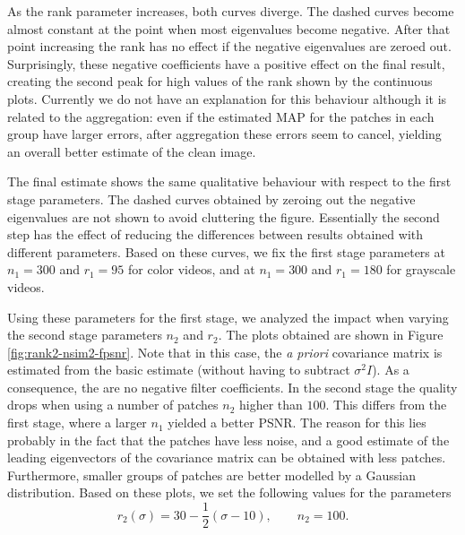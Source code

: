 \documentclass[10pt, a4paper]{article}
\newcommand{\pa}[1]{#1}
\newcommand{\padd}[1]{\pa{#1}}
\newcommand{\pcomment}[1]{}
\begin{document}
\padd{As the rank parameter increases, both curves diverge. 
The dashed curves become almost constant at the point when
most eigenvalues become negative. After that point increasing the
rank has no effect if the negative eigenvalues are zeroed out.
%
Surprisingly, these negative coefficients have a positive effect on the final 
result, creating the second peak for high values of the rank shown by the
continuous plots. Currently we do not have an explanation for this behaviour
although it is related to the aggregation: even if the estimated MAP for the
patches in each group have larger errors, after aggregation these errors seem
to cancel, yielding an overall better estimate of the clean image.}

\padd{The final estimate shows the same qualitative behaviour with respect to the first
stage parameters. The dashed curves obtained by zeroing out the negative
eigenvalues are not shown to avoid cluttering the figure. Essentially the
second step has the effect of reducing the differences between results obtained
with different parameters. Based on these curves, we fix the first stage parameters at
$n_1 = 300$ and $r_1 = 95$ for color videos, and at $n_1 = 300$ and $r_1 = 180$ for grayscale videos.}

Using these parameters for the first stage, we analyzed the impact when varying the second stage
parameters $n_2$ and $r_2$. The plots obtained are shown in Figure
\ref{fig:rank2-nsim2-fpsnr}.
%
Note that in this case, the \emph{a
priori} covariance matrix is estimated from the basic estimate (without having
to subtract $\sigma^2I$). As a consequence, the are no negative filter coefficients.
%
In the second stage the quality drops when
using a number of patches $n_2$ higher than $100$. This differs from the first stage,
where a larger $n_1$ yielded a better PSNR.
The reason for this lies probably in the fact that the patches have less noise,
and a good estimate of the leading eigenvectors of the covariance matrix can be obtained
with less patches. Furthermore, smaller groups of patches
are better modelled by a Gaussian distribution.
Based on these plots, we set the following values for the parameters
\[r_2(\sigma) = 30 - \frac12(\sigma - 10),\quad\quad n_{2} = 100.\]
\end{document}
